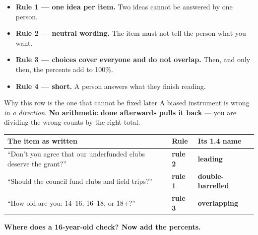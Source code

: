 \documentclass[aspectratio=169, 11pt]{beamer}
\newcommand{\redink}[1]{{\color{redacc}\bfseries #1}}
\begin{document}
\begin{frame}[t, plain]
  \vspace{2pt}
  \begin{itemize}\setlength{\itemsep}{5pt}
    \item \textbf{Rule 1 --- one idea per item.} Two ideas cannot be answered by one person.
    \item \textbf{Rule 2 --- neutral wording.} The item must not tell the person what you want.
    \item \textbf{Rule 3 --- choices cover everyone and do not overlap.} Then, and only then, the
          percents add to 100\%.
    \item \textbf{Rule 4 --- short.} A person answers what they finish reading.
  \end{itemize}
  \vspace{6pt}
  \begin{block}{Why this row is the one that cannot be fixed later}
    A biased instrument is wrong \emph{in a direction}. \redink{No arithmetic done afterwards
    pulls it back} --- you are dividing the wrong counts by the right total.
  \end{block}
\end{frame}

\begin{frame}[t, plain]
  \vspace{2pt}
  \begin{center}
    \small
    \renewcommand{\arraystretch}{1.35}
    \begin{tabular}{@{} p{7.2cm} l l @{}}
    \hline
    \textbf{The item as written} & \textbf{Rule} & \textbf{Its 1.4 name} \\
    \hline
    ``Don't you agree that our underfunded clubs deserve the grant?''
      & \redink{rule 2} & \redink{leading} \\
    ``Should the council fund clubs and field trips?''
      & \redink{rule 1} & \redink{double-barrelled} \\
    ``How old are you: 14--16, 16--18, or 18+?''
      & \redink{rule 3} & \redink{overlapping} \\
    \hline
    \end{tabular}
  \end{center}
  \vspace{8pt}
  \begin{center}
    {\color{cerulean}\bfseries Where does a 16-year-old check? Now add the percents.}
  \end{center}
\end{frame}
\end{document}
